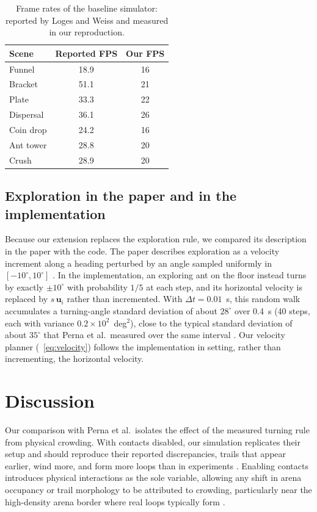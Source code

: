 \documentclass[9pt,twoside]{pnas-new}
\begin{document}
\begin{table}[t]
\centering
\caption{Frame rates of the baseline simulator: reported by Loges and Weiss \cite{loges2025} and measured in our reproduction.}
\label{tab:fps}
\begin{tabular}{lcc}
\toprule
Scene & Reported FPS & Our FPS \\
\midrule
Funnel    & 18.9 & 16  \\
Bracket   & 51.1 & 21  \\
Plate     & 33.3 & 22  \\
Dispersal & 36.1 & 26  \\
Coin drop & 24.2 & 16  \\
Ant tower & 28.8 & 20  \\
Crush     & 28.9 & 20  \\
\bottomrule
\end{tabular}
\end{table}

\subsection{Exploration in the paper and in the implementation}
Because our extension replaces the exploration rule, we compared its description in the paper with the code. The paper describes exploration as a velocity increment along a heading perturbed by an angle sampled uniformly in $[-10^\circ, 10^\circ]$ \cite{loges2025}. In the implementation, an exploring ant on the floor instead turns by exactly $\pm 10^\circ$ with probability $1/5$ at each step, and its horizontal velocity is replaced by $s\,\mathbf{u}_i$ rather than incremented. With $\Delta t = 0.01$~s, this random walk accumulates a turning-angle standard deviation of about $28^\circ$ over 0.4~s (40 steps, each with variance $0.2 \times 10^2$~deg$^2$), close to the typical standard deviation of about $35^\circ$ that Perna et al.\ measured over the same interval \cite{perna2012}. Our velocity planner (~\eqref{eq:velocity}) follows the implementation in setting, rather than incrementing, the horizontal velocity.






\section{Discussion}
Our comparison with Perna et al.\ isolates the effect of the measured turning rule from physical crowding. With contacts disabled, our simulation replicates their setup and should reproduce their reported discrepancies, trails that appear earlier, wind more, and form more loops than in experiments \cite{perna2012}. Enabling contacts introduces physical interactions as the sole variable, allowing any shift in arena occupancy or trail morphology to be attributed to crowding, particularly near the high-density arena border where real loops typically form \cite{perna2012}.
\end{document}
